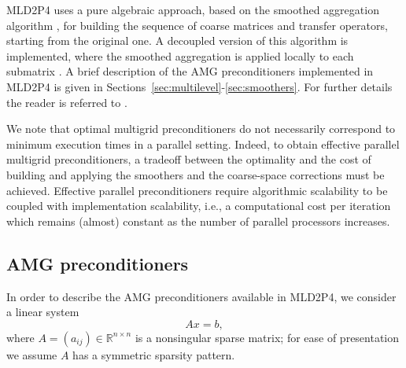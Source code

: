 MLD2P4 uses a pure algebraic approach, based on the smoothed 
aggregation algorithm \cite{BREZINA_VANEK,VANEK_MANDEL_BREZINA},
for building the sequence of coarse matrices and transfer operators,
starting from the original one.
A decoupled version of this algorithm is implemented, where the smoothed
aggregation is applied locally to each submatrix \cite{TUMINARO_TONG}.
A brief description of the AMG preconditioners implemented in MLD2P4 is given in 
Sections~\ref{sec:multilevel}-\ref{sec:smoothers}. For further details the reader
is referred to \cite{para_04,aaecc_07,apnum_07,MLD2P4_TOMS}.

We note that optimal multigrid preconditioners do not necessarily correspond
to minimum execution times in a parallel setting. Indeed, to obtain effective parallel
multigrid preconditioners, a tradeoff between the optimality and the cost of building and
applying the smoothers and the coarse-space corrections must be achieved. Effective
parallel preconditioners require algorithmic scalability to be coupled with implementation
scalability, i.e., a computational cost per iteration which remains (almost) constant as
the number of parallel processors increases.


\subsection{AMG preconditioners\label{sec:multilevel}}

In order to describe the AMG preconditioners available in MLD2P4, we consider a
linear system
\begin{equation}
Ax=b, \label{eq:system}
\end{equation}
where $A=(a_{ij}) \in \mathbb{R}^{n \times n}$ is a nonsingular sparse matrix;
for ease of presentation we assume $A$ has a symmetric sparsity
pattern.

